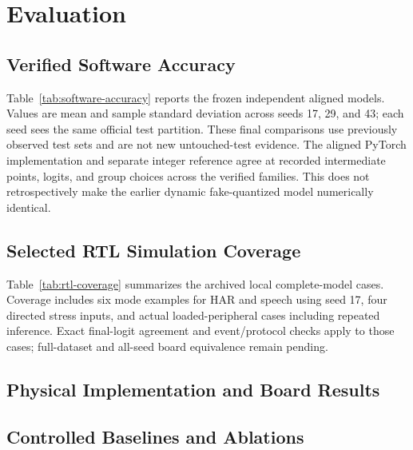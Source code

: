 \section{Evaluation}
\label{sec:evaluation}
\subsection{Verified Software Accuracy}
Table~\ref{tab:software-accuracy} reports the frozen independent aligned models.
Values are mean and sample standard deviation across seeds 17, 29, and 43;
each seed sees the same official test partition. These final comparisons use
previously observed test sets and are not new untouched-test evidence. The
aligned PyTorch implementation and separate integer reference agree at recorded
intermediate points, logits, and group choices across the verified families.
This does not retrospectively make the earlier dynamic fake-quantized model
numerically identical.


\subsection{Selected RTL Simulation Coverage}
Table~\ref{tab:rtl-coverage} summarizes the archived local complete-model cases.
Coverage includes six mode examples for HAR and speech using seed 17, four directed stress
inputs, and actual loaded-peripheral cases including repeated inference.
Exact final-logit agreement and event/protocol checks apply to those cases;
full-dataset and all-seed board equivalence remain pending.


\subsection{Physical Implementation and Board Results}

\subsection{Controlled Baselines and Ablations}

